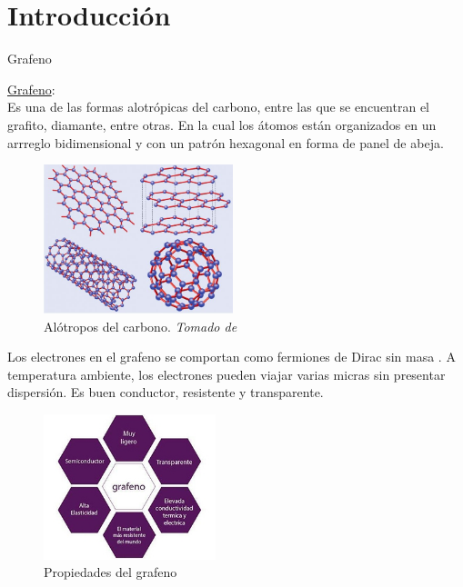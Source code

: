 \section{Introducción}

\begin{frame}{Grafeno}
	\justifying
	\begin{multicols}{2}

		\underline{Grafeno}:\\
		Es una de las formas alotrópicas del carbono, entre las que se encuentran el grafito, diamante, entre otras. En la cual los átomos están organizados en un arrreglo bidimensional y con un patrón hexagonal en forma de panel de abeja.

		\begin{figure}
		\includegraphics[width=5.5cm]{graficas/alotropo.jpg}
		\caption{ Alótropos del carbono. \textit{Tomado de }\cite{Neto2006}}
		\label{grafeno}
		\end{figure}
	\end{multicols}
\end{frame}

\begin{frame}
	\justifying
	\begin{multicols}{2}
		Los electrones en el grafeno se comportan como fermiones de Dirac sin masa \cite{Katsnelson2007}. A temperatura ambiente, los electrones pueden viajar varias micras sin presentar dispersión. Es buen conductor, resistente y transparente.
		\begin{figure}
			\includegraphics[width=5cm]{graficas/propiedadesGrafeno.jpg}
			\caption{Propiedades del grafeno}
		\end{figure}
		\end{multicols}
\end{frame}

